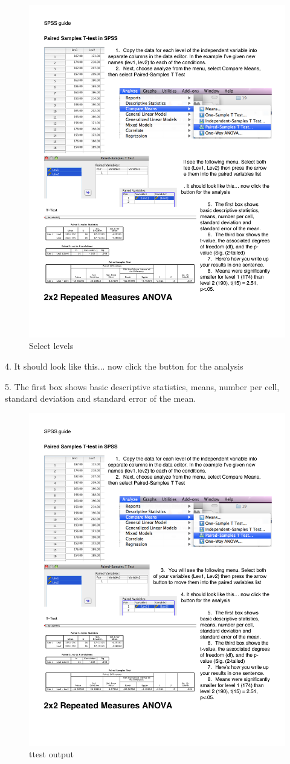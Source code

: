 \begin{figure}
      \includegraphics[width=.5\linewidth]{LabmanualFigures/SPSS3.pdf}
      \caption{Select levels}
      \label{fig:SPSS3}
\end{figure}

4. It should look like this... now click the button for the analysis


5. The first box shows basic descriptive statistics, means, number per cell, standard deviation and standard error of the mean.


\begin{figure}
      \includegraphics[width=\linewidth]{LabmanualFigures/SPSS4.pdf}
      \caption{ttest output}
      \label{fig:SPSS4}
\end{figure}


